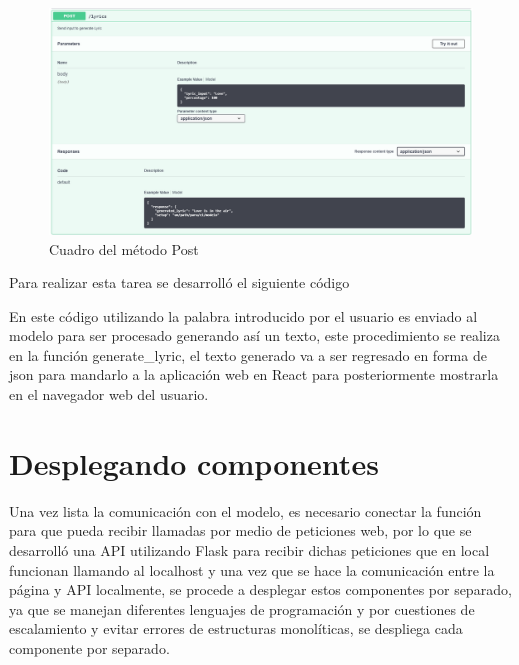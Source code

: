 \documentclass[12pt, a4paper, titlepage]{article}
\begin{document}
	\begin{figure}[H]
		\includegraphics[width=13.5cm]{./Imagenes/BackEnd/Post.png}
		\centering 
		\caption{Cuadro del método Post}
	\end{figure}
	Para realizar esta tarea se desarrolló el siguiente código
	\begin{center}
		
	\end{center}
	En este código utilizando la palabra introducido por el usuario es enviado al modelo para ser procesado generando así un texto, este procedimiento se realiza en la función generate\_lyric, el texto generado va a ser regresado en forma de json para mandarlo a la aplicación web en React para posteriormente mostrarla en el navegador web del usuario.
	\newpage
	\section{Desplegando componentes}
		Una vez lista la comunicación con el modelo, es necesario conectar la función para que pueda recibir llamadas por medio de peticiones web, por lo que se desarrolló una API utilizando Flask para recibir dichas peticiones que en local funcionan llamando al localhost y una vez que se hace la comunicación entre la página y API localmente, se procede a desplegar estos componentes por separado, ya que se manejan diferentes lenguajes de programación y por cuestiones de escalamiento y evitar errores de estructuras monolíticas, se despliega cada componente por separado.
		
\end{document}
